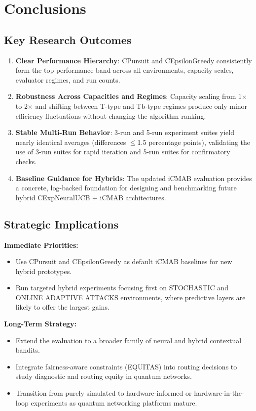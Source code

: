 \documentclass[12pt,a4paper]{article}
\begin{document}
\newpage
\section{Conclusions}

\subsection{Key Research Outcomes}

\begin{enumerate}
\item \textbf{Clear Performance Hierarchy}: CPursuit and CEpsilonGreedy consistently form the top performance band across all environments, capacity scales, evaluator regimes, and run counts.
\item \textbf{Robustness Across Capacities and Regimes}: Capacity scaling from 1$\times$ to 2$\times$ and shifting between T-type and Tb-type regimes produce only minor efficiency fluctuations without changing the algorithm ranking.
\item \textbf{Stable Multi-Run Behavior}: 3-run and 5-run experiment suites yield nearly identical averages (differences $\leq$1.5 percentage points), validating the use of 3-run suites for rapid iteration and 5-run suites for confirmatory checks.
\item \textbf{Baseline Guidance for Hybrids}: The updated iCMAB evaluation provides a concrete, log-backed foundation for designing and benchmarking future hybrid CExpNeuralUCB + iCMAB architectures.
\end{enumerate}

\subsection{Strategic Implications}

\textbf{Immediate Priorities:}
\begin{itemize}
\item Use CPursuit and CEpsilonGreedy as default iCMAB baselines for new hybrid prototypes.
\item Run targeted hybrid experiments focusing first on STOCHASTIC and ONLINE ADAPTIVE ATTACKS environments, where predictive layers are likely to offer the largest gains.
\end{itemize}

\textbf{Long-Term Strategy:}
\begin{itemize}
\item Extend the evaluation to a broader family of neural and hybrid contextual bandits.
\item Integrate fairness-aware constraints (EQUITAS) into routing decisions to study diagnostic and routing equity in quantum networks.
\item Transition from purely simulated to hardware-informed or hardware-in-the-loop experiments as quantum networking platforms mature.
\end{itemize}
\end{document}

